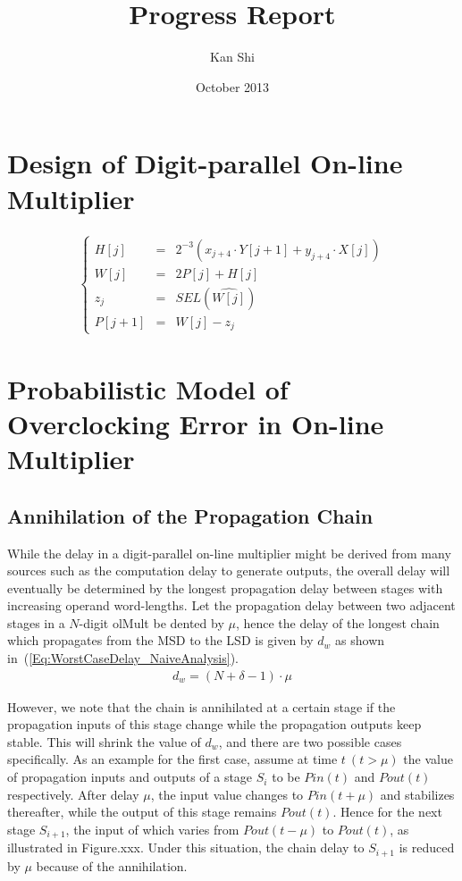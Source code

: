 \documentclass[a4paper, 11pt]{article}
\title{Progress Report}
\author{Kan Shi}
\date{October 2013}
\begin{document}
\maketitle
\vspace{-10mm}

\section{Design of Digit-parallel On-line Multiplier}
\begin{eqnarray}\label{Eq:OnlineMult}
  \left\{\begin{matrix}
    H[j] & = & 2^{-3}(x_{j+4}\cdot Y[j+1]+y_{j+4}\cdot X[j])\\
    W[j] & = & 2P[j]+H[j]\\
    z_j  & = & SEL(\widehat{W[j]})\\
    P[j+1] & = & W[j]-z_j
  \end{matrix}\right.
\end{eqnarray}

\section{Probabilistic Model of Overclocking Error in On-line Multiplier}
\subsection{Annihilation of the Propagation Chain}\label{subSec:AnnihilationOfChain}

While the delay in a digit-parallel on-line multiplier might be derived from many sources such as the computation delay to generate outputs, the overall delay will eventually be determined by the longest propagation delay between stages with increasing operand word-lengths. Let the propagation delay between two adjacent stages in a $N$-digit olMult be dented by $\mu$, hence the delay of the longest chain which propagates from the MSD to the LSD is given by $d_w$ as shown in~(\ref{Eq:WorstCaseDelay_NaiveAnalysis}).
\begin{eqnarray}\label{Eq:WorstCaseDelay_NaiveAnalysis}
  d_w = (N+\delta-1)\cdot \mu
\end{eqnarray}

However, we note that the chain is annihilated at a certain stage if the propagation inputs of this stage change while the propagation outputs keep stable. This will shrink the value of $d_w$, and there are two possible cases specifically. As an example for the first case, assume at time $t~(t>\mu)$ the value of propagation inputs and outputs of a stage $S_i$ to be $Pin(t)$ and $Pout(t)$ respectively. After delay $\mu$, the input value changes to $Pin(t+\mu)$ and stabilizes thereafter, while the output of this stage remains $Pout(t)$. Hence for the next stage $S_{i+1}$, the input of which varies from $Pout(t-\mu)$ to $Pout(t)$, as illustrated in Figure.xxx. Under this situation, the chain delay to $S_{i+1}$ is reduced by $\mu$ because of the annihilation. 
\end{document}
